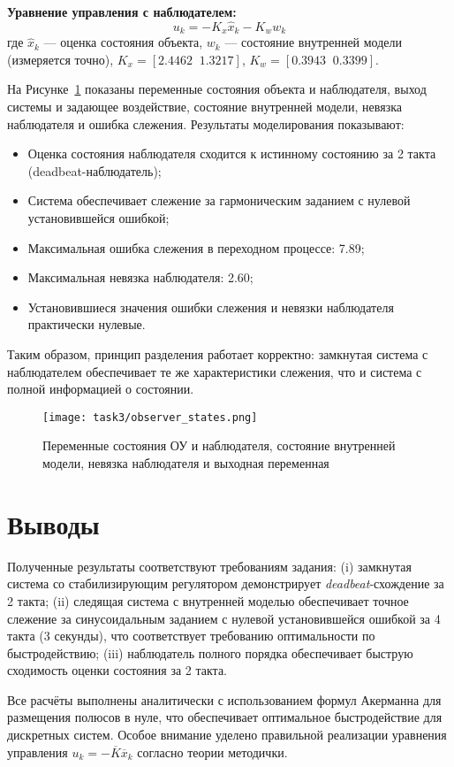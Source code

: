 \textbf{Уравнение управления с наблюдателем:}
\[
u_k = -K_x \hat x_k - K_w w_k
\]
где $\hat x_k$ — оценка состояния объекта, $w_k$ — состояние внутренней модели (измеряется точно), $K_x=[2.4462\;\;1.3217]$, $K_w=[0.3943\;\;0.3399]$.

На Рисунке~\ref{fig:task3_obs} показаны переменные состояния объекта и наблюдателя, выход системы и задающее воздействие, состояние внутренней модели, невязка наблюдателя и ошибка слежения. Результаты моделирования показывают:
\begin{itemize}
    \item Оценка состояния наблюдателя сходится к истинному состоянию за 2 такта (deadbeat-наблюдатель);
    \item Система обеспечивает слежение за гармоническим заданием с нулевой установившейся ошибкой;
    \item Максимальная ошибка слежения в переходном процессе: 7.89;
    \item Максимальная невязка наблюдателя: 2.60;
    \item Установившиеся значения ошибки слежения и невязки наблюдателя практически нулевые.
\end{itemize}
Таким образом, принцип разделения работает корректно: замкнутая система с наблюдателем обеспечивает те же характеристики слежения, что и система с полной информацией о состоянии.

\begin{figure}[H]
    \centering
    \texttt{[image: task3/observer\_states.png]}
    \caption{Переменные состояния ОУ и наблюдателя, состояние внутренней модели, невязка наблюдателя и выходная переменная}
    \label{fig:task3_obs}
\end{figure}

\section{Выводы}
Полученные результаты соответствуют требованиям задания: (i) замкнутая система со стабилизирующим регулятором демонстрирует \textit{deadbeat}-схождение за 2 такта; (ii) следящая система с внутренней моделью обеспечивает точное слежение за синусоидальным заданием с нулевой установившейся ошибкой за 4 такта (3 секунды), что соответствует требованию оптимальности по быстродействию; (iii) наблюдатель полного порядка обеспечивает быструю сходимость оценки состояния за 2 такта. 

Все расчёты выполнены аналитически с использованием формул Акерманна для размещения полюсов в нуле, что обеспечивает оптимальное быстродействие для дискретных систем. Особое внимание уделено правильной реализации уравнения управления $u_k = -\overline{K} \overline{x}_k$ согласно теории методички.



